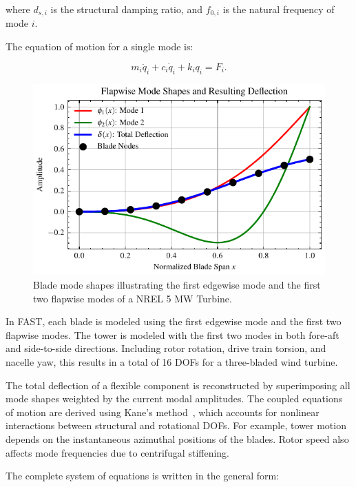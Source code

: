 where $d_{s,i}$ is the structural damping ratio, and $f_{0,i}$ is the natural frequency of mode $i$.

The equation of motion for a single mode is:

\begin{equation}
    m_i \ddot{q}_i + c_i \dot{q}_i + k_i q_i = F_i. \label{eq:single_mode_eom}
\end{equation}

\begin{figure}[ht]
    \centering
    \includegraphics[width=\textwidth]{Figures/blade_modes.pdf}
    \caption{Blade mode shapes illustrating the first edgewise mode and the first two flapwise modes of a NREL 5 MW Turbine.}
    \label{fig:blade_mode_shapes}
\end{figure}

In FAST, each blade is modeled using the first edgewise mode and the first two flapwise modes. The tower is modeled with the first two modes in both fore-aft and side-to-side directions. Including rotor rotation, drive train torsion, and nacelle yaw, this results in a total of 16 DOFs for a three-bladed wind turbine.

The total deflection of a flexible component is reconstructed by superimposing all mode shapes weighted by the current modal amplitudes. The coupled equations of motion are derived using Kane’s method~\cite{kane1985}, which accounts for nonlinear interactions between structural and rotational DOFs. For example, tower motion depends on the instantaneous azimuthal positions of the blades. Rotor speed also affects mode frequencies due to centrifugal stiffening.

The complete system of equations is written in the general form:

